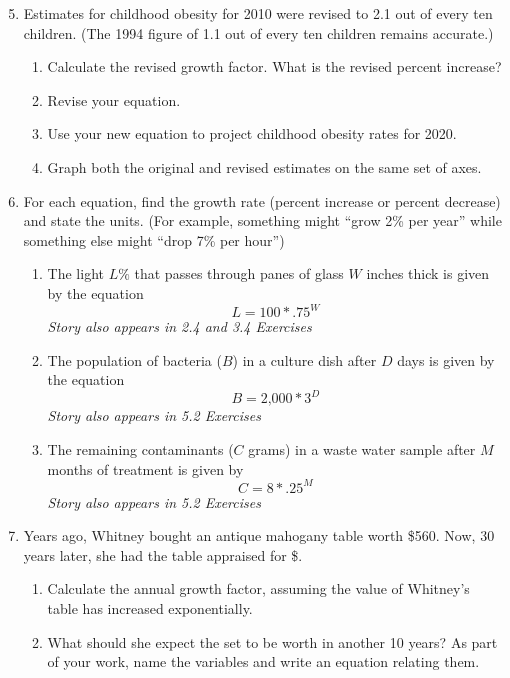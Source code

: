 \begin{enumerate} 
\setcounter{enumi}{4}

\item Estimates for childhood obesity for 2010 were revised to 2.1 out of every ten children.  (The 1994 figure of 1.1 out of every ten children remains accurate.)
\begin{enumerate}
\item Calculate the revised growth factor.  What is the revised percent increase?
\item Revise your equation.
\item Use your new equation to project childhood obesity rates for 2020.
\item Graph both the original and revised estimates on the same set of axes.  
\end{enumerate}

\item For each equation, find the growth rate (percent increase or percent decrease) and state the units. (For example, something might ``grow 2\% per year'' while something else might ``drop 7\% per hour'')  
\begin{enumerate} 
\item The light $L\%$ that passes through panes of glass $W$ inches thick is given by the equation
$$L = 100\ast .75^W$$
\hfill \emph{Story also appears in 2.4 and 3.4 Exercises}

\item The population of bacteria ($B$) in a culture dish after $D$ days is given by the equation $$B=\text{2,000}\ast 3^D$$
\hfill \emph{Story also appears in 5.2 Exercises}

\item The remaining contaminants ($C$ grams) in a waste water sample after $M$ months of treatment is given by $$C=8 \ast .25^M$$
\hfill \emph{Story also appears in 5.2 Exercises}
\end{enumerate}

\item Years ago, Whitney bought an antique mahogany table worth \$560.  Now, 30 years later, she had the table appraised for \$.  
\begin{enumerate}
\item Calculate the annual growth factor, assuming the value of Whitney's table has increased exponentially.
\item What should she expect the set to be worth in another 10 years? As part of your work, name the variables and write an equation relating them.
\end{enumerate}


\end{enumerate}
